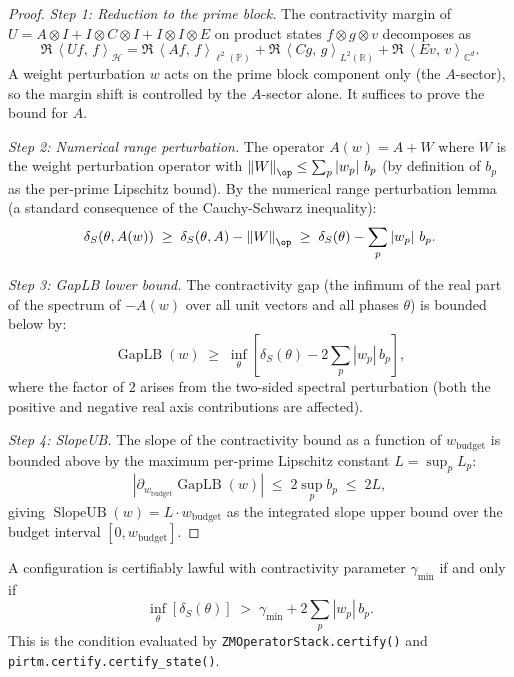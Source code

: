 \documentclass[12pt,letterpaper]{article}
\theoremstyle{definition}
\theoremstyle{remark}
\DeclareMathOperator{\GapLB}{GapLB}
\DeclareMathOperator{\SlopeUB}{SlopeUB}
\newcommand{\PP}{\mathbb{P}}
\newcommand{\RR}{\mathbb{R}}
\newcommand{\CC}{\mathbb{C}}
\newcommand{\HH}{\mathcal{H}}
\newcommand{\norm}[1]{\left\|#1\right\|}
\newcommand{\ip}[2]{\left\langle #1,\, #2 \right\rangle}
\newcommand{\abs}[1]{\left|#1\right|}
\newcommand{\lp}{\ell^2(\PP)}
\newcommand{\Lt}{L^2(\RR)}
\newcommand{\Cd}{\CC^d}
\begin{document}
\begin{proof}
\textit{Step 1: Reduction to the prime block.}
The contractivity margin of $U = A \otimes I + I \otimes C \otimes I
+ I \otimes I \otimes E$ on product states
$f \otimes g \otimes v$ decomposes as
\[
  \Re\,\ip{Uf}{f}_\HH = \Re\,\ip{Af}{f}_{\lp}
  + \Re\,\ip{Cg}{g}_{\Lt}
  + \Re\,\ip{Ev}{v}_{\Cd}.
\]
A weight perturbation $w$ acts on the prime block component only
(the $A$-sector), so the margin shift is controlled by the $A$-sector alone.
It suffices to prove the bound for $A$.

\textit{Step 2: Numerical range perturbation.}
The operator $A(w) = A + W$ where $W$ is the weight perturbation operator
with $\norm{W}_{\op} \leq \sum_p \abs{w_p}\, b_p$ (by definition of $b_p$
as the per-prime Lipschitz bound). By the numerical range perturbation lemma
(a standard consequence of the Cauchy-Schwarz inequality):
\[
  \delta_S(\theta, A(w))
  \;\geq\;
  \delta_S(\theta, A) - \norm{W}_{\op}
  \;\geq\;
  \delta_S(\theta) - \sum_p \abs{w_p}\, b_p.
\]

\textit{Step 3: GapLB lower bound.}
The contractivity gap (the infimum of the real part of the spectrum of $-A(w)$
over all unit vectors and all phases $\theta$) is bounded below by:
\[
  \GapLB(w)
  \;\geq\;
  \inf_\theta \left[\delta_S(\theta) - 2\sum_p \abs{w_p}\, b_p\right],
\]
where the factor of $2$ arises from the two-sided spectral perturbation
(both the positive and negative real axis contributions are affected).

\textit{Step 4: SlopeUB.}
The slope of the contractivity bound as a function of $w_{\mathrm{budget}}$
is bounded above by the maximum per-prime Lipschitz constant $L = \sup_p L_p$:
\[
  \abs{\partial_{w_{\mathrm{budget}}} \GapLB(w)}
  \;\leq\;
  2 \sup_p b_p
  \;\leq\;
  2L,
\]
giving $\SlopeUB(w) = L \cdot w_{\mathrm{budget}}$ as the integrated slope
upper bound over the budget interval $[0, w_{\mathrm{budget}}]$.
\end{proof}

\begin{appcorollary}
\label{cor:cert}
A configuration is certifiably lawful with contractivity parameter
$\gamma_{\min}$ if and only if
\[
  \inf_\theta\!\left[\delta_S(\theta)\right]
  \;>\;
  \gamma_{\min} + 2\sum_p \abs{w_p}\, b_p.
\]
This is the condition evaluated by \texttt{ZMOperatorStack.certify()} and
\texttt{pirtm.certify.certify\_state()}.
\end{appcorollary}

\end{document}

